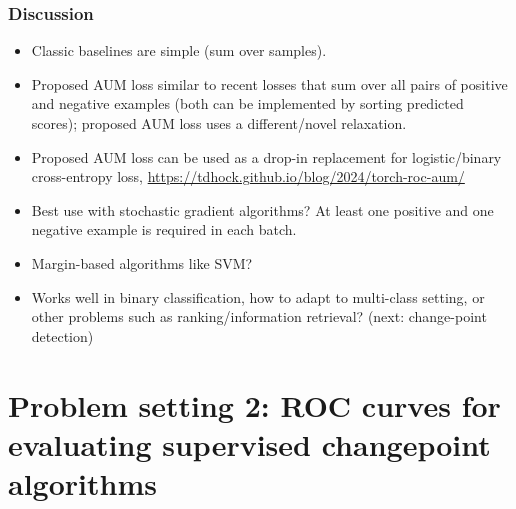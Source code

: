 \documentclass[t]{beamer}
\begin{document}
\begin{frame}
  \frametitle{Discussion}
  \begin{itemize}
  \item Classic baselines are simple (sum over samples).
  \item Proposed AUM loss similar to recent losses that sum over all
    pairs of positive and negative examples (both can be implemented
    by sorting predicted scores); proposed AUM loss uses a
    different/novel relaxation.
  \item Proposed AUM loss can be used as a drop-in replacement for logistic/binary cross-entropy loss, \url{https://tdhock.github.io/blog/2024/torch-roc-aum/}
  \item Best use with stochastic gradient algorithms?
    At least one positive and one negative example is required in each
    batch.
  \item Margin-based algorithms like SVM?
  \item Works well in binary classification, how to adapt to
    multi-class setting, or other problems such as ranking/information
    retrieval? (next: change-point detection)
  \end{itemize}
\end{frame}


\section{Problem setting 2: ROC curves for evaluating supervised changepoint algorithms}
\end{document}
